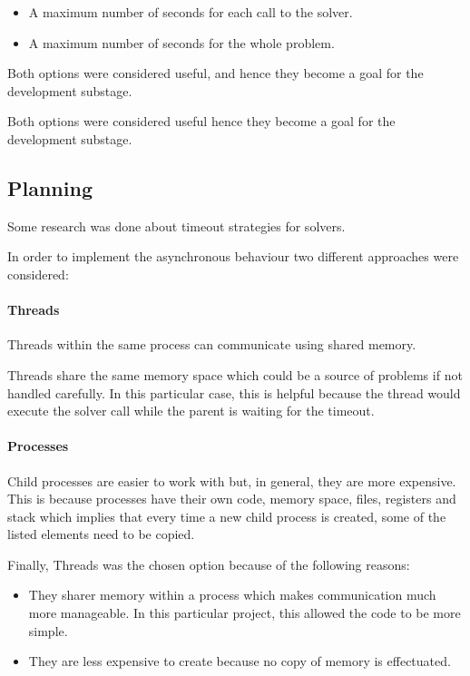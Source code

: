 \begin{itemize}
	\item A maximum number of seconds for each call to the solver.
	\item A maximum number of seconds for the whole problem. 
\end{itemize}
Both options were considered useful, and hence they become a goal for the development substage. 

Both options were considered useful hence they become a goal for the development substage.  

\subsection{Planning}
Some research was done about timeout strategies for solvers.  


In order to implement the asynchronous behaviour two different approaches were considered:  

\paragraph{Threads}

Threads within the same process can communicate using shared memory.  

Threads share the same memory space which could be a source of problems if not handled carefully. In this particular case, this is helpful because the thread would execute the solver call while the parent is waiting for the timeout.  



\paragraph{Processes}

Child processes are easier to work with but, in general, they are more expensive. This is because processes have their own code, memory space, files, registers and stack which implies that every time a new child process is created, some of the listed elements need to be copied.  





Finally, Threads was the chosen option because of the following reasons: 

\begin{itemize}
	\item They sharer memory within a process which makes communication much more manageable. In this particular project, this allowed the code to be more simple. 
	\item They are less expensive to create because no copy of memory is effectuated.
\end{itemize}

